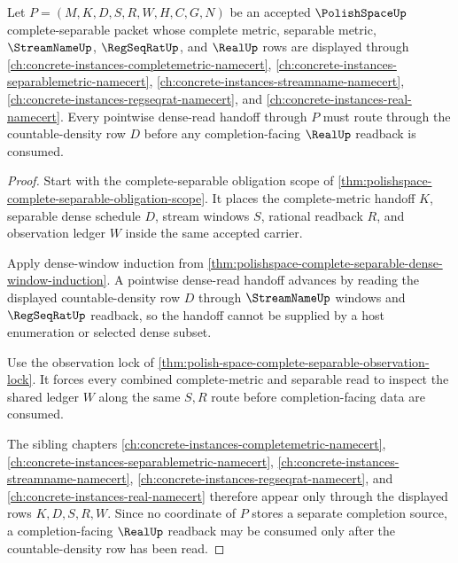 \begin{theorem}
\label{thm:polishspace-complete-separable-pointwise-density-handoff}
Let $P=(M,K,D,S,R,W,H,C,G,N)$ be an accepted $\PolishSpaceUp$ complete-separable packet whose complete metric, separable metric, $\StreamNameUp$, $\RegSeqRatUp$, and $\RealUp$ rows are displayed through \autoref{ch:concrete-instances-completemetric-namecert}, \autoref{ch:concrete-instances-separablemetric-namecert}, \autoref{ch:concrete-instances-streamname-namecert}, \autoref{ch:concrete-instances-regseqrat-namecert}, and \autoref{ch:concrete-instances-real-namecert}. Every pointwise dense-read handoff through $P$ must route through the countable-density row $D$ before any completion-facing $\RealUp$ readback is consumed.
\end{theorem}
\begin{proof}
Start with the complete-separable obligation scope of \autoref{thm:polishspace-complete-separable-obligation-scope}. It places the complete-metric handoff $K$, separable dense schedule $D$, stream windows $S$, rational readback $R$, and observation ledger $W$ inside the same accepted carrier.

Apply dense-window induction from \autoref{thm:polishspace-complete-separable-dense-window-induction}. A pointwise dense-read handoff advances by reading the displayed countable-density row $D$ through $\StreamNameUp$ windows and $\RegSeqRatUp$ readback, so the handoff cannot be supplied by a host enumeration or selected dense subset.

Use the observation lock of \autoref{thm:polish-space-complete-separable-observation-lock}. It forces every combined complete-metric and separable read to inspect the shared ledger $W$ along the same $S,R$ route before completion-facing data are consumed.

The sibling chapters \autoref{ch:concrete-instances-completemetric-namecert}, \autoref{ch:concrete-instances-separablemetric-namecert}, \autoref{ch:concrete-instances-streamname-namecert}, \autoref{ch:concrete-instances-regseqrat-namecert}, and \autoref{ch:concrete-instances-real-namecert} therefore appear only through the displayed rows $K,D,S,R,W$. Since no coordinate of $P$ stores a separate completion source, a completion-facing $\RealUp$ readback may be consumed only after the countable-density row has been read.
\end{proof}

